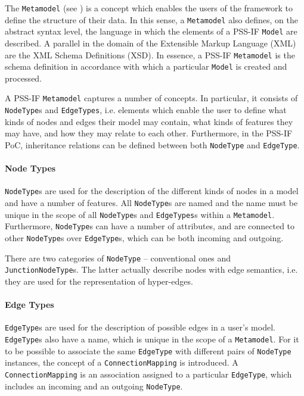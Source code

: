 The \texttt{Metamodel} (see ) is a concept which enables the users of the framework to define the structure of their data. In this sense, a \texttt{Metamodel} also defines, on the abstract syntax level, the language in which the elements of a PSS-IF \texttt{Model} are described. A parallel in the domain of the Extensible Markup Language (XML) are the XML Schema Definitions (XSD). In essence, a PSS-IF \texttt{Metamodel} is the schema definition in accordance with which a particular \texttt{Model} is created and processed.

A PSS-IF \texttt{Metamodel} captures a number of concepts. In particular, it consists of \texttt{NodeType}s and \texttt{EdgeTypes}, i.e. elements which enable the user to define what kinds of nodes and edges their model may contain, what kinds of features they may have, and how they may relate to each other. Furthermore, in the PSS-IF PoC, inheritance relations can be defined between both \texttt{NodeType} and \texttt{EdgeType}.

\paragraph{Node Types}

\texttt{NodeType}s are used for the description of the different kinds of nodes in a model and have a number of features. All \texttt{NodeType}s are named and the name must be unique in the scope of all \texttt{NodeType}s and \texttt{EdgeTypes}s within a \texttt{Metamodel}. Furthermore, \texttt{NodeType}s can have a number of attributes, and are connected to other \texttt{NodeType}s over \texttt{EdgeType}s, which can be both incoming and outgoing.

There are two categories of \texttt{NodeType} -- conventional ones and \texttt{JunctionNodeType}s. The latter actually describe nodes with edge semantics, i.e. they are used for the representation of hyper-edges.

\paragraph{Edge Types}

\texttt{EdgeType}s are used for the description of possible edges in a user's model. \texttt{EdgeType}s also have a name, which is unique in the scope of a \texttt{Metamodel}. For it to be possible to associate the same \texttt{EdgeType} with different pairs of \texttt{NodeType} instances, the concept of a \texttt{ConnectionMapping} is introduced. A \texttt{ConnectionMapping} is an association assigned to a particular \texttt{EdgeType}, which includes an incoming and an outgoing \texttt{NodeType}.

